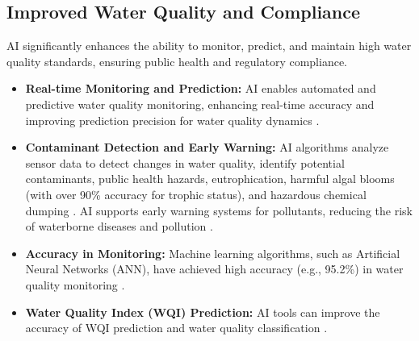 \subsection{Improved Water Quality and Compliance}
AI significantly enhances the ability to monitor, predict, and maintain high water quality standards, ensuring public health and regulatory compliance.
\begin{itemize}
    \item \textbf{Real-time Monitoring and Prediction:} AI enables automated and predictive water quality monitoring, enhancing real-time accuracy and improving prediction precision for water quality dynamics \cite{MDPI_Benefits_2, EFCNetwork_Benefits_2}.
    \item \textbf{Contaminant Detection and Early Warning:} AI algorithms analyze sensor data to detect changes in water quality, identify potential contaminants, public health hazards, eutrophication, harmful algal blooms (with over 90\% accuracy for trophic status), and hazardous chemical dumping \cite{SpectroscopyOnline_Benefits, IWAPOnline_Benefits}. AI supports early warning systems for pollutants, reducing the risk of waterborne diseases and pollution \cite{ELearnCollege_Benefits}.
    \item \textbf{Accuracy in Monitoring:} Machine learning algorithms, such as Artificial Neural Networks (ANN), have achieved high accuracy (e.g., 95.2\%) in water quality monitoring \cite{MDPI_Benefits_2}.
    \item \textbf{Water Quality Index (WQI) Prediction:} AI tools can improve the accuracy of WQI prediction and water quality classification \cite{ELearnCollege_Benefits}.
\end{itemize}

